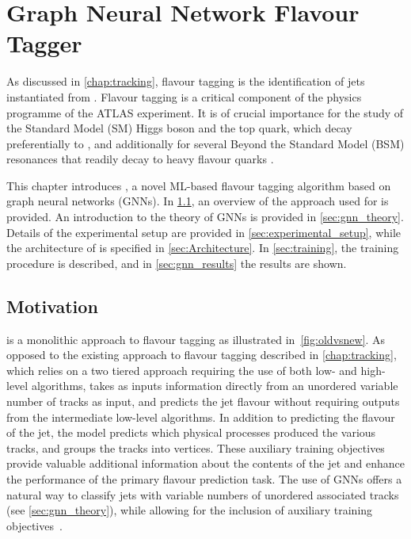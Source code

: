 \chapter{Graph Neural Network Flavour Tagger}\label{chap:gnn_tagger}

As discussed in \cref{chap:tracking}, flavour tagging is the identification of jets instantiated from \bchadrons.
Flavour tagging is a critical component of the physics programme of the ATLAS experiment. 
It is of crucial importance for the study of the Standard Model (SM) Higgs boson and the top quark, which decay preferentially to \bquarks \cite{HIGG-2018-04,HIGG-2018-13}, and additionally for several Beyond the Standard Model (BSM) resonances that readily decay to heavy flavour quarks \cite{EXOT-2019-03}.

This chapter introduces \GNN, a novel ML-based flavour tagging algorithm based on graph neural networks (GNNs).
In \cref{sec:gnn_motvation}, an overview of the approach used for \GNN is provided.
An introduction to the theory of GNNs is provided in \cref{sec:gnn_theory}.
Details of the experimental setup are provided in \cref{sec:experimental_setup}, while the architecture of \GNN is specified in \cref{sec:Architecture}.
In \cref{sec:training}, the training procedure is described, and in \cref{sec:gnn_results} the results are shown.

\section{Motivation}\label{sec:gnn_motvation}

\GNN is a monolithic approach to flavour tagging as illustrated in~\cref{fig:oldvsnew}.
As opposed to the existing approach to flavour tagging described in \cref{chap:tracking}, which relies on a two tiered approach requiring the use of both low- and high-level algorithms,
\GNN takes as inputs information directly from an unordered variable number of tracks as input, and predicts the jet flavour without requiring outputs from the intermediate low-level algorithms.
In addition to predicting the flavour of the jet, the model predicts which physical processes produced the various tracks, and groups the tracks into vertices.
These auxiliary training objectives provide valuable additional information about the contents of the jet and enhance the performance of the primary flavour prediction task.
The use of GNNs offers a natural way to classify jets with variable numbers of unordered associated tracks (see \cref{sec:gnn_theory}), while allowing for the inclusion of auxiliary training objectives~\cite{2020-gnn-for-sv,serviansky2020set2graph}.

